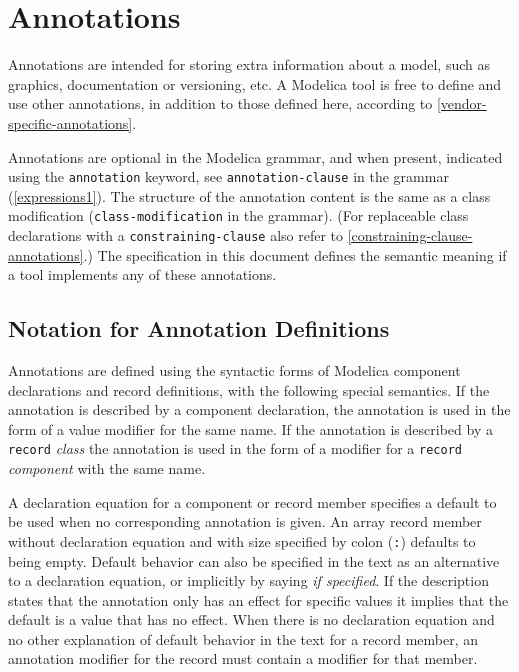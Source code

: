 \chapter{Annotations}\label{annotations}

Annotations are intended for storing extra information about a model, such as graphics, documentation or versioning, etc.
A Modelica tool is free to define and use other annotations, in addition to those defined here, according to \cref{vendor-specific-annotations}.

Annotations are optional in the Modelica grammar, and when present, indicated using the \lstinline!annotation! keyword, see \lstinline[language=grammar]!annotation-clause! in the grammar (\cref{expressions1}).
The structure of the annotation content is the same as a class modification (\lstinline[language=grammar]!class-modification! in the grammar).
(For replaceable class declarations with a \lstinline[language=grammar]!constraining-clause! also refer to \cref{constraining-clause-annotations}.)
The specification in this document defines the semantic meaning if a tool implements any of these annotations.

\section{Notation for Annotation Definitions}\label{notation-for-annotation-definitions}

Annotations are defined using the syntactic forms of Modelica component declarations and record definitions, with the following special semantics.
If the annotation is described by a component declaration, the annotation is used in the form of a value modifier for the same name.
If the annotation is described by a \lstinline!record! \emph{class} the annotation is used in the form of a modifier for a \lstinline!record! \emph{component} with the same name.

A declaration equation for a component or record member specifies a default to be used when no corresponding annotation is given.
An array record member without declaration equation and with size specified by colon (\lstinline!:!) defaults to being empty.
Default behavior can also be specified in the text as an alternative to a declaration equation, or implicitly by saying \emph{if specified}.
If the description states that the annotation only has an effect for specific values it implies that the default is a value that has no effect.
When there is no declaration equation and no other explanation of default behavior in the text for a record member, an annotation modifier for the record must contain a modifier for that member.

